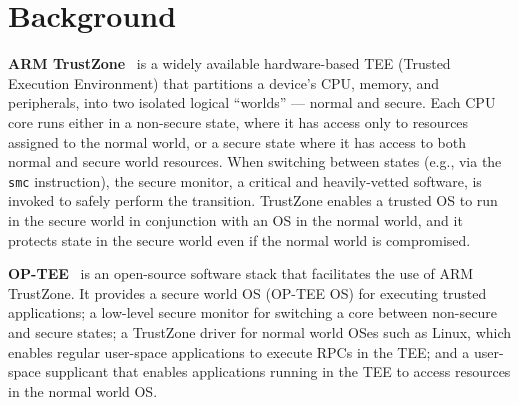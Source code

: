 
\chapter{Background}
\label{ch:Background}

{\bf ARM TrustZone}~\cite{trustzone} is a widely available hardware-based TEE
(Trusted Execution Environment) that partitions a device's CPU, memory, and
peripherals, into two isolated logical ``worlds'' --- normal and secure. Each
CPU core runs either in a non-secure state, where it has access only to
resources assigned to the normal world, or a secure state where it has access to
both normal and secure world resources. When switching between states (e.g., via
the {\tt smc} instruction), the secure monitor, a critical and heavily-vetted
software, is invoked to safely perform the transition. TrustZone enables a
trusted OS to run in the secure world in conjunction with an OS in the normal
world, and it protects state in the secure world even if the normal world is
compromised.

{\bf OP-TEE}~\cite{optee} is an open-source software stack that facilitates the
use of ARM TrustZone. It provides a secure world OS (OP-TEE OS) for executing
trusted applications; a low-level secure monitor for switching a core between
non-secure and secure states; a TrustZone driver for normal world OSes such as
Linux, which enables regular user-space applications to execute RPCs in the TEE;
and a user-space supplicant that enables applications running in the TEE to
access resources in the normal world OS.

\endinput